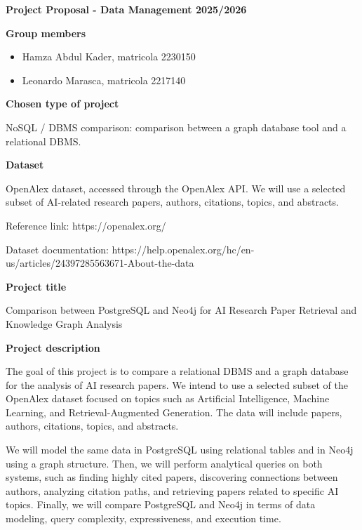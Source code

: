 \documentclass[11pt]{article}
\begin{document}
\begin{center}
    {\Large \textbf{Project Proposal - Data Management 2025/2026}}
\end{center}

\textbf{Group members}
\begin{itemize}
    \item Hamza Abdul Kader, matricola 2230150
    \item Leonardo Marasca, matricola 2217140
\end{itemize}

\textbf{Chosen type of project}

NoSQL / DBMS comparison: comparison between a graph database tool and a relational DBMS.

\textbf{Dataset}

OpenAlex dataset, accessed through the OpenAlex API. We will use a selected subset of AI-related research papers, authors, citations, topics, and abstracts.

Reference link: https://openalex.org/

Dataset documentation: https://help.openalex.org/hc/en-us/articles/24397285563671-About-the-data

\textbf{Project title}

Comparison between PostgreSQL and Neo4j for AI Research Paper Retrieval and Knowledge Graph Analysis

\textbf{Project description}

The goal of this project is to compare a relational DBMS and a graph database for the analysis of AI research papers. We intend to use a selected subset of the OpenAlex dataset focused on topics such as Artificial Intelligence, Machine Learning, and Retrieval-Augmented Generation. The data will include papers, authors, citations, topics, and abstracts.

We will model the same data in PostgreSQL using relational tables and in Neo4j using a graph structure. Then, we will perform analytical queries on both systems, such as finding highly cited papers, discovering connections between authors, analyzing citation paths, and retrieving papers related to specific AI topics. Finally, we will compare PostgreSQL and Neo4j in terms of data modeling, query complexity, expressiveness, and execution time.
\end{document}
